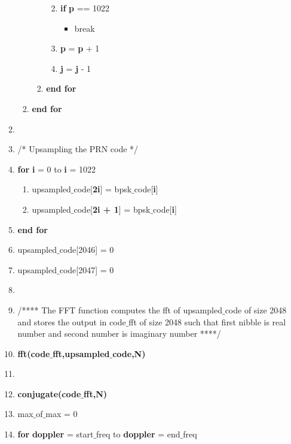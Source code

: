 \documentclass[journal,10pt,onecolumn]{article}
\begin{document}
\begin{itemize}
\begin{enumerate}
\begin{enumerate}
\begin{enumerate}
\begin{enumerate}
\begin{itemize}
                \end{itemize}
                \item[] \textbf{if} \textbf{p} == 1022
                \begin{itemize}
                    \item[] break
                \end{itemize}
                \item[] \textbf{p} = \textbf{p} + 1
                \item[] \textbf{j} = \textbf{j} - 1
            \end{enumerate}
            \item[] \textbf{end for}

        \end{enumerate}

        \item[] \textbf{end for}
    \end{enumerate}
    \item[]
    \item[] /* Upsampling the PRN code */
    \item[] \textbf{for} \textbf{i} = 0 to \textbf{i} = 1022
    \begin{enumerate}
        \item[] upsampled$\_$code[\textbf{2i}] =  bpsk$\_$code[\textbf{i}]
        \item[] upsampled$\_$code[\textbf{2i + 1}] =  bpsk$\_$code[\textbf{i}]
    \end{enumerate}
    \item[] \textbf{end for}
    \item[] upsampled$\_$code[2046] = 0
    \item[] upsampled$\_$code[2047] = 0
    \item[] 
    \item[] /**** The FFT function computes the fft of upsampled$\_$code of size 2048 and stores the output in code$\_$fft of size 2048 such that first nibble is real number and second number is imaginary number ****/
    \item[] \textbf{fft(code$\_$fft,upsampled$\_$code,N)}
    \item[] 
    \item[] \textbf{conjugate(code$\_$fft,N)}
    \item[] max$\_$of$\_$max = 0
    \item[] \textbf{for} \textbf{doppler} = start$\_$freq to \textbf{doppler} = end$\_$freq
    \begin{enumerate}
    

\end{enumerate}
\end{enumerate}
\end{itemize}
\end{document}
